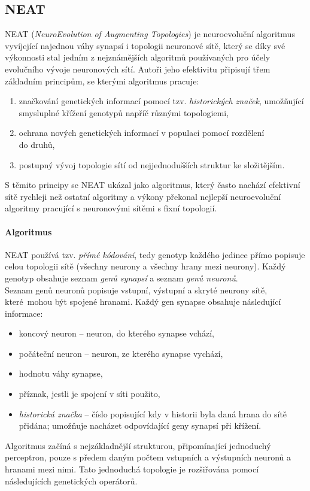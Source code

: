\subsection{NEAT} \label{NN - NEAT}
NEAT (\emph{NeuroEvolution of Augmenting Topologies})
\citep{stanley2002evolving} je neuroevoluční algoritmus vyvíjející najednou
váhy synapsí i topologii neuronové sítě, který se díky své výkonnosti stal
jedním z nejznámějších algoritmů používaných pro účely evolučního vývoje
neuronových sítí. Autoři jeho efektivitu připisují třem základním principům, se
kterými algoritmus pracuje:
\begin{enumerate}
    \item značkování genetických informací pomocí tzv. \emph{historických značek},
        umožňující smysluplné křížení genotypů napříč různými topologiemi,
   \item ochrana nových genetických informací v populaci pomocí rozdělení\\
       do druhů,
    \item postupný vývoj topologie sítí od nejjednodušších struktur ke
        složitějším.
\end{enumerate}
S těmito principy se NEAT ukázal jako algoritmus, který často nachází efektivní
sítě rychleji než ostatní algoritmy a výkony překonal nejlepší neuroevoluční
algoritmy pracující s neuronovými sítěmi s fixní topologií.

\paragraph{Algoritmus}
NEAT používá tzv. \emph{přímé kódování}, tedy genotyp každého jedince přímo
popisuje celou topologii sítě (všechny neurony a všechny hrany mezi neurony).
Každý genotyp obsahuje seznam \emph{genů synapsí} a seznam \emph{genů neuronů}.
\\Seznam genů neuronů popisuje vstupní, výstupní a skryté neurony sítě,
které~mohou být spojené hranami. Každý gen synapse obsahuje následující
informace: 
\begin{itemize}
    \item koncový neuron -- neuron, do kterého synapse vchází,
    \item počáteční neuron -- neuron, ze kterého synapse vychází,
    \item hodnotu váhy synapse,
    \item příznak, jestli je spojení v síti použito,
    \item \emph{historická značka} -- číslo popisující kdy v historii
        byla daná hrana do sítě přidána; umožňuje nacházet
        odpovídající geny synapsí při křížení.
\end{itemize}
Algoritmus začíná s nejzákladnější strukturou, připomínající jednoduchý
perceptron, pouze s předem daným počtem vstupních a výstupních neuronů a
hranami mezi nimi. Tato jednoduchá topologie je rozšiřována pomocí
následujících genetických operátorů.

